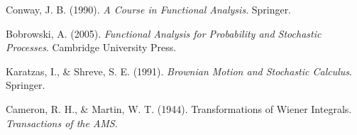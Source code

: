 \documentclass[12pt]{report}
\begin{document}
\begin{thebibliography}{9}
Conway, J. B. (1990). \textit{A Course in Functional Analysis}. Springer.

Bobrowski, A. (2005). \textit{Functional Analysis for Probability and Stochastic Processes}. Cambridge University Press.

Karatzas, I., \& Shreve, S. E. (1991). \textit{Brownian Motion and Stochastic Calculus}. Springer.

Cameron, R. H., \& Martin, W. T. (1944). Transformations of Wiener Integrals. \textit{Transactions of the AMS}.
\end{thebibliography}
\end{document}
